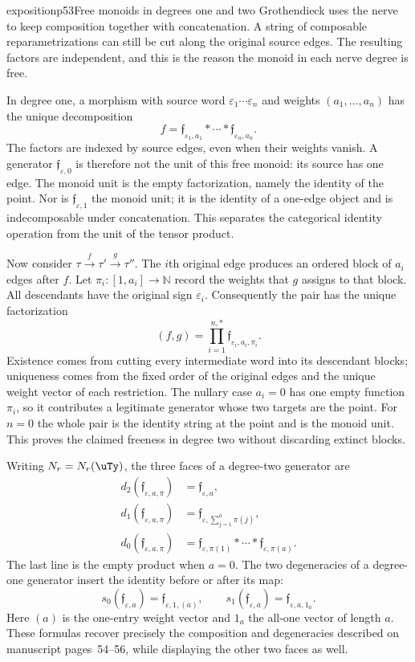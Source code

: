 \begin{dcomment}{exposition}{p53}{Free monoids in degrees one and two}
Grothendieck uses the nerve to keep composition together with concatenation. A string of composable reparametrizations can still be cut along the original source edges. The resulting factors are independent, and this is the reason the monoid in each nerve degree is free.

In degree one, a morphism with source word $\varepsilon_1\cdots\varepsilon_n$ and weights $(a_1,\ldots,a_n)$ has the unique decomposition
\[
 f=\mathfrak f_{\varepsilon_1,a_1}*\cdots*
       \mathfrak f_{\varepsilon_n,a_n}.
\]
The factors are indexed by source edges, even when their weights vanish. A generator $\mathfrak f_{\varepsilon,0}$ is therefore not the unit of this free monoid: its source has one edge. The monoid unit is the empty factorization, namely the identity of the point. Nor is $\mathfrak f_{\varepsilon,1}$ the monoid unit; it is the identity of a one-edge object and is indecomposable under concatenation. This separates the categorical identity operation from the unit of the tensor product.

Now consider $\tau\xrightarrow f\tau'\xrightarrow g\tau''$. The $i$th original edge produces an ordered block of $a_i$ edges after $f$. Let $\pi_i:[1,a_i]\to\mathbb N$ record the weights that $g$ assigns to that block. All descendants have the original sign $\varepsilon_i$. Consequently the pair has the unique factorization
\[
 (f,g)=\prod_{i=1}^{n,*}\mathfrak f_{\varepsilon_i,a_i,\pi_i}.
\]
Existence comes from cutting every intermediate word into its descendant blocks; uniqueness comes from the fixed order of the original edges and the unique weight vector of each restriction. The nullary case $a_i=0$ has one empty function $\pi_i$, so it contributes a legitimate generator whose two targets are the point. For $n=0$ the whole pair is the identity string at the point and is the monoid unit. This proves the claimed freeness in degree two without discarding extinct blocks.

Writing $N_r=N_r(\uTy)$, the three faces of a degree-two generator are
\[
\begin{aligned}
 d_2(\mathfrak f_{\varepsilon,a,\pi})
    &=\mathfrak f_{\varepsilon,a},\\
 d_1(\mathfrak f_{\varepsilon,a,\pi})
    &=\mathfrak f_{\varepsilon,\sum_{j=1}^{a}\pi(j)},\\
 d_0(\mathfrak f_{\varepsilon,a,\pi})
    &=\mathfrak f_{\varepsilon,\pi(1)}*\cdots*
        \mathfrak f_{\varepsilon,\pi(a)}.
\end{aligned}
\]
The last line is the empty product when $a=0$. The two degeneracies of a degree-one generator insert the identity before or after its map:
\[
 s_0(\mathfrak f_{\varepsilon,a})
       =\mathfrak f_{\varepsilon,1,(a)},\qquad
 s_1(\mathfrak f_{\varepsilon,a})
       =\mathfrak f_{\varepsilon,a,1_a}.
\]
Here $(a)$ is the one-entry weight vector and $1_a$ the all-one vector of length $a$. These formulas recover precisely the composition and degeneracies described on manuscript pages~54--56, while displaying the other two faces as well.


\end{dcomment}
